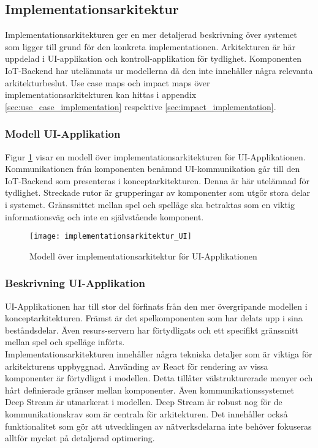 \subsection{Implementationsarkitektur}
Implementationsarkitekturen ger en mer detaljerad beskrivning över systemet som ligger till grund för den konkreta implementationen. Arkitekturen är här uppdelad i UI-applikation och kontroll-applikation för tydlighet. Komponenten IoT-Backend har utelämnats ur modellerna då den inte innehåller några relevanta arkitekturbeslut. Use case maps och impact maps över implementationsarkitekturen kan hittas i appendix \ref{sec:use_case_implementation} respektive \ref{sec:impact_implementation}.

\subsubsection{Modell UI-Applikation}
Figur \ref{fig:implementationsarkitektur-UI} visar en modell över implementationsarkitekturen för UI-Applikationen. Kommunikationen från komponenten benämnd UI-kommunikation går till den IoT-Backend som presenteras i konceptarkitekturen. Denna är här utelämnad för tydlighet. Streckade rutor är grupperingar av komponenter som utgör stora delar i systemet. Gränssnittet mellan spel och spelläge ska betraktas som en viktig informationsväg och inte en självstående komponent.

\begin{figure}[h]
    \centering
    \texttt{[image: implementationsarkitektur\_UI]}
    \caption{Modell över implementationsarkitektur för UI-Applikationen}
    \label{fig:implementationsarkitektur-UI}
\end{figure}

\subsubsection{Beskrivning UI-Applikation}
\label{subsubsec:implementation-desc-UI}
UI-Applikationen har till stor del förfinats från den mer övergripande modellen i konceptarkitekturen. Främst är det spelkomponenten som har delats upp i sina beståndsdelar. Även resurs-servern har förtydligats och ett specifikt gränssnitt mellan spel och spelläge införts.\\

Implementationsarkitekturen innehåller några tekniska detaljer som är viktiga för arkitekturens uppbyggnad. Använding av React för rendering av vissa komponenter är förtydligat i modellen. Detta tillåter välstrukturerade menyer och hårt definierade gränser mellan komponenter. Även kommunikationssystemet Deep Stream är utmarkerat i modellen. Deep Stream är robust nog för de kommunikationskrav som är centrala för arkitekturen. Det innehåller också funktionalitet som gör att utvecklingen av nätverksdelarna inte behöver fokuseras alltför mycket på detaljerad optimering.\\

